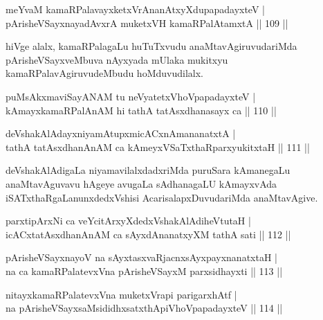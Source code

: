 
\begin{shl}
meYvaM kamaRPalavayxketxVrAnanAtxyXdupapadayxteV |\\
pArisheVSayxnayadAvxrA muketxVH kamaRPalAtamxtA \hfill || 109 ||
\end{shl}

\begin{artha}
hiVge alalx, kamaRPalagaLu huTuTxvudu anaMtavAgiruvudariMda pArisheVSayxveMbuva nAyxyada mUlaka mukitxyu kamaRPalavAgiruvudeMbudu  hoMduvudilalx.
\end{artha}


\begin{shl}
puMsAkxmaviSayANAM tu neVyatetxVhoVpapadayxteV |\\
kAmayxkamaRPalAnAM hi tathA tatAsxdhanasayx ca \hfill || 110 ||
\end{shl}

\begin{shl}
deVshakAlAdayxniyamAtupxmicACxnAmananatxtA |\\
tathA tatAsxdhanAnAM ca kAmeyxVSaTxthaRparxyukitxtaH \hfill || 111 ||
\end{shl}

\begin{artha}
deVshakAlAdigaLa niyamavilalxdadxriMda puruSara kAmanegaLu anaMtavAguvavu hAgeye avugaLa sAdhanagaLU kAmayxvAda iSATxthaRgaLanunxdedxVshisi AcarisalapxDuvudariMda anaMtavAgive.
\end{artha}


\begin{shl}
parxtipArxNi ca veYcitArxyXdedxVshakAlAdiheVtutaH |\\
icACxtatAsxdhanAnAM ca sAyxdAnanatxyXM tathA sati \hfill || 112 ||
\end{shl}

\begin{shl}
pArisheVSayxnayoV na sAyxtasxvaRjacnxsAyxpayxnanatxtaH |\\
na ca kamaRPalatevxVna pArisheVSayxM parxsidhayxti \hfill || 113 ||
\end{shl}

\begin{shl}
nitayxkamaRPalatevxVna muketxVrapi parigarxhAtf |\\
na pArisheVSayxsaMsididhxsatxthA\s piVhoVpapadayxteV \hfill || 114 ||
\end{shl}

